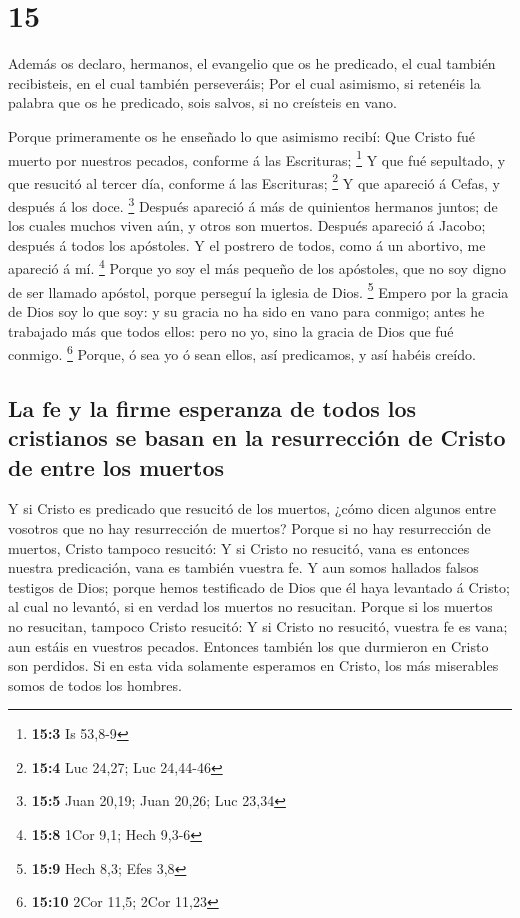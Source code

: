\hypertarget{section-14}{%
\section{15}\label{section-14}}

 Además os declaro, hermanos, el evangelio que os he
predicado, el cual también recibisteis, en el cual también perseveráis;
 Por el cual asimismo, si retenéis la palabra que os he
predicado, sois salvos, si no creísteis en vano.

 Porque primeramente os he enseñado lo que asimismo
recibí: Que Cristo fué muerto por nuestros pecados, conforme á las
Escrituras; \footnote{\textbf{15:3} Is 53,8-9}  Y que fué
sepultado, y que resucitó al tercer día, conforme á las Escrituras;
\footnote{\textbf{15:4} Luc 24,27; Luc 24,44-46}  Y que
apareció á Cefas, y después á los doce. \footnote{\textbf{15:5} Juan
  20,19; Juan 20,26; Luc 23,34}  Después apareció á más de
quinientos hermanos juntos; de los cuales muchos viven aún, y otros son
muertos.  Después apareció á Jacobo; después á todos los
apóstoles.  Y el postrero de todos, como á un abortivo, me
apareció á mí. \footnote{\textbf{15:8} 1Cor 9,1; Hech 9,3-6}
 Porque yo soy el más pequeño de los apóstoles, que no soy
digno de ser llamado apóstol, porque perseguí la iglesia de Dios.
\footnote{\textbf{15:9} Hech 8,3; Efes 3,8}  Empero por
la gracia de Dios soy lo que soy: y su gracia no ha sido en vano para
conmigo; antes he trabajado más que todos ellos: pero no yo, sino la
gracia de Dios que fué conmigo. \footnote{\textbf{15:10} 2Cor 11,5; 2Cor
  11,23}  Porque, ó sea yo ó sean ellos, así predicamos,
y así habéis creído.

\hypertarget{la-fe-y-la-firme-esperanza-de-todos-los-cristianos-se-basan-en-la-resurrecciuxf3n-de-cristo-de-entre-los-muertos}{%
\subsection{La fe y la firme esperanza de todos los cristianos se basan
en la resurrección de Cristo de entre los
muertos}\label{la-fe-y-la-firme-esperanza-de-todos-los-cristianos-se-basan-en-la-resurrecciuxf3n-de-cristo-de-entre-los-muertos}}

 Y si Cristo es predicado que resucitó de los muertos,
¿cómo dicen algunos entre vosotros que no hay resurrección de muertos?
 Porque si no hay resurrección de muertos, Cristo tampoco
resucitó:  Y si Cristo no resucitó, vana es entonces
nuestra predicación, vana es también vuestra fe.  Y aun
somos hallados falsos testigos de Dios; porque hemos testificado de Dios
que él haya levantado á Cristo; al cual no levantó, si en verdad los
muertos no resucitan.  Porque si los muertos no
resucitan, tampoco Cristo resucitó:  Y si Cristo no
resucitó, vuestra fe es vana; aun estáis en vuestros pecados.
 Entonces también los que durmieron en Cristo son
perdidos.  Si en esta vida solamente esperamos en Cristo,
los más miserables somos de todos los hombres.

